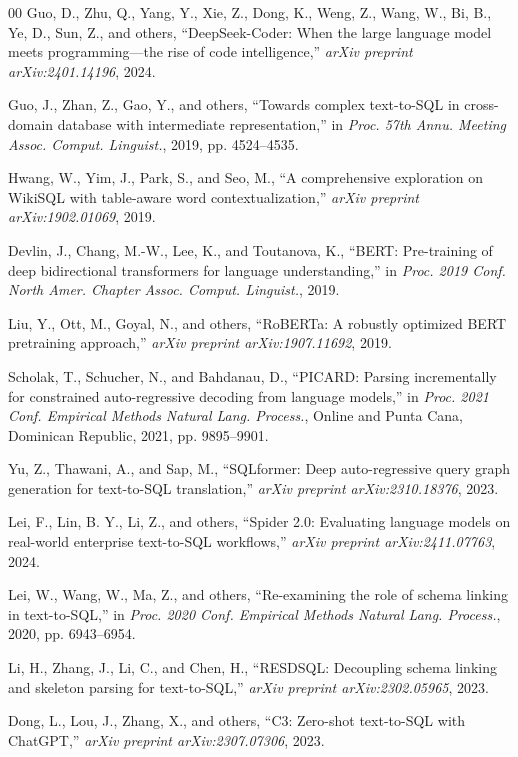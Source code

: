 \documentclass[conference]{IEEEtran}
\begin{document}
\begin{thebibliography}{00}
 Guo, D., Zhu, Q., Yang, Y., Xie, Z., Dong, K., Weng, Z., Wang, W., Bi, B., Ye, D., Sun, Z., and others, ``DeepSeek-Coder: When the large language model meets programming—the rise of code intelligence,'' \textit{arXiv preprint arXiv:2401.14196}, 2024.

 Guo, J., Zhan, Z., Gao, Y., and others, ``Towards complex text-to-SQL in cross-domain database with intermediate representation,'' in \textit{Proc. 57th Annu. Meeting Assoc. Comput. Linguist.}, 2019, pp. 4524--4535.

 Hwang, W., Yim, J., Park, S., and Seo, M., ``A comprehensive exploration on WikiSQL with table-aware word contextualization,'' \textit{arXiv preprint arXiv:1902.01069}, 2019.

 Devlin, J., Chang, M.-W., Lee, K., and Toutanova, K., ``BERT: Pre-training of deep bidirectional transformers for language understanding,'' in \textit{Proc. 2019 Conf. North Amer. Chapter Assoc. Comput. Linguist.}, 2019.

 Liu, Y., Ott, M., Goyal, N., and others, ``RoBERTa: A robustly optimized BERT pretraining approach,'' \textit{arXiv preprint arXiv:1907.11692}, 2019.

 Scholak, T., Schucher, N., and Bahdanau, D., ``PICARD: Parsing incrementally for constrained auto-regressive decoding from language models,'' in \textit{Proc. 2021 Conf. Empirical Methods Natural Lang. Process.}, Online and Punta Cana, Dominican Republic, 2021, pp. 9895--9901.

 Yu, Z., Thawani, A., and Sap, M., ``SQLformer: Deep auto-regressive query graph generation for text-to-SQL translation,'' \textit{arXiv preprint arXiv:2310.18376}, 2023.

 Lei, F., Lin, B. Y., Li, Z., and others, ``Spider 2.0: Evaluating language models on real-world enterprise text-to-SQL workflows,'' \textit{arXiv preprint arXiv:2411.07763}, 2024.

 Lei, W., Wang, W., Ma, Z., and others, ``Re-examining the role of schema linking in text-to-SQL,'' in \textit{Proc. 2020 Conf. Empirical Methods Natural Lang. Process.}, 2020, pp. 6943--6954.

 Li, H., Zhang, J., Li, C., and Chen, H., ``RESDSQL: Decoupling schema linking and skeleton parsing for text-to-SQL,'' \textit{arXiv preprint arXiv:2302.05965}, 2023.

 Dong, L., Lou, J., Zhang, X., and others, ``C3: Zero-shot text-to-SQL with ChatGPT,'' \textit{arXiv preprint arXiv:2307.07306}, 2023.


\end{thebibliography}
\end{document}
